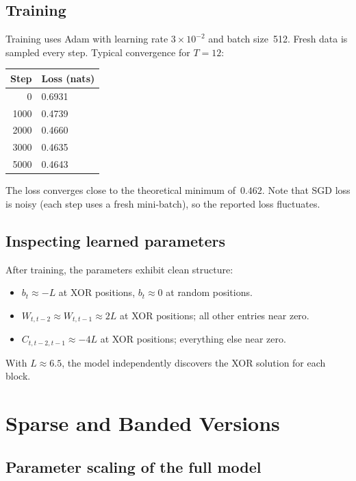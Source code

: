 \documentclass[11pt]{article}
\begin{document}
\subsection{Training}

Training uses Adam with learning rate $3 \times 10^{-2}$ and batch
size~512.  Fresh data is sampled every step.  Typical convergence for
$T = 12$:
\begin{center}
\begin{tabular}{rl}
\toprule
Step & Loss (nats) \\
\midrule
0    & 0.6931 \\
1000 & 0.4739 \\
2000 & 0.4660 \\
3000 & 0.4635 \\
5000 & 0.4643 \\
\bottomrule
\end{tabular}
\end{center}
The loss converges close to the theoretical minimum of~$0.462$.  Note
that SGD loss is noisy (each step uses a fresh mini-batch), so the
reported loss fluctuates.

\subsection{Inspecting learned parameters}

After training, the parameters exhibit clean structure:
\begin{itemize}
  \item $b_t \approx -L$ at XOR positions, $b_t \approx 0$ at random
        positions.
  \item $W_{t, t-2} \approx W_{t, t-1} \approx 2L$ at XOR positions;
        all other entries near zero.
  \item $C_{t, t-2, t-1} \approx -4L$ at XOR positions; everything else
        near zero.
\end{itemize}
With $L \approx 6.5$, the model independently discovers the XOR solution
for each block.

\section{Sparse and Banded Versions}\label{sec:banded}

\subsection{Parameter scaling of the full model}
\end{document}
